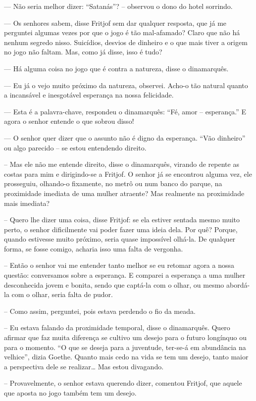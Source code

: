 --- Não seria melhor dizer: ``Satanás''? -- observou o dono do hotel
sorrindo.

--- Os senhores sabem, disse Fritjof sem dar qualquer resposta, que já me
perguntei algumas vezes por que o jogo é tão mal-afamado? Claro que não
há nenhum segredo nisso. Suicídios, desvios de dinheiro e o que mais
tiver a origem no jogo não faltam. Mas, como já disse, isso é tudo?

--- Há alguma coisa no jogo que é contra a natureza, disse o dinamarquês.

--- Eu já o vejo muito próximo da natureza, observei. Acho-o tão natural
quanto a incansável e inesgotável esperança na nossa felicidade.

--- Esta é a palavra-chave, respondeu o dinamarquês: ``Fé, amor --
esperança.'' E agora o senhor entende o que sobrou disso!

--- O senhor quer dizer que o assunto não é digno da esperança. ``Vão
dinheiro'' ou algo parecido -- se estou entendendo direito.

-- Mas ele não me entende direito, disse o dinamarquês, virando de
repente as costas para mim e dirigindo-se a Fritjof. O senhor já se
encontrou alguma vez, ele prosseguiu, olhando-o fixamente, no metrô ou
num banco do parque, na proximidade imediata de uma mulher atraente? Mas
realmente na proximidade mais imediata?

-- Quero lhe dizer uma coisa, disse Fritjof: se ela estiver sentada
mesmo muito perto, o senhor dificilmente vai poder fazer uma ideia dela.
Por quê? Porque, quando estivesse muito próximo, seria quase impossível
olhá-la. De qualquer forma, se fosse comigo, acharia isso uma falta de
vergonha.

-- Então o senhor vai me entender tanto melhor se eu retomar agora a
nossa questão: conversamos sobre a esperança. E comparei a esperança a
uma mulher desconhecida jovem e bonita, sendo que captá-la com o olhar,
ou mesmo abordá-la com o olhar, seria falta de pudor.

-- Como assim, perguntei, pois estava perdendo o fio da meada.

-- Eu estava falando da proximidade temporal, disse o dinamarquês. Quero
afirmar que faz muita diferença se cultivo um desejo para o futuro
longínquo ou para o momento. ``O que se deseja para a juventude,
ter-se-á em abundância na velhice'', dizia Goethe. Quanto mais cedo na
vida se tem um desejo, tanto maior a perspectiva dele se realizar\ldots{} Mas
estou divagando.

-- Provavelmente, o senhor estava querendo dizer, comentou Fritjof, que
aquele que aposta no jogo também tem um desejo.

